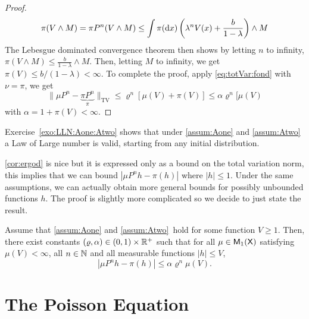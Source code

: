 \documentclass[english,graybox,envcountchap,envcountsame,sectrefs,shortlabels]{svmono}
\theoremstyle{style}
\newenvironment{svmultproof}{\small \begin{proof}}{\end{proof}}
\newcommand{\eqsp}{}
\begin{document}
\begin{svmultproof}
$$
\pi(V\wedge M)=\pi P^n(V\wedge M) \leq \int \pi(\mathrm{d} x) \left(\lambda^n V(x)+\frac{b}{1-\lambda}\right) \wedge M
$$
The Lebesgue dominated convergence theorem then shows by letting $n$ to infinity, $\pi(V\wedge M)\leq \frac{b}{1-\lambda} \wedge M$. Then, letting $M$ to infinity, we get $\pi(V)\leq b/(1-\lambda)<\infty$. To complete the proof, apply \eqref{eq:totVar:fond} with $\nu=\pi$, we get
$$
\|\mu P^n -\underbrace{\pi P^n}_{\pi}\|_{\mathrm{TV}}\leq \varrho^n [\mu(V) +\pi(V)]\leq \alpha \varrho^n [\mu(V)
$$
with $\alpha=1+\pi(V)<\infty$.
\end{svmultproof}


Exercise~\ref{exo:LLN:Aone:Atwo} shows that under \ref{assum:Aone} and \ref{assum:Atwo} a Law of Large number is valid, starting from any initial distribution.

\autoref{cor:ergod} is nice but it is expressed only as a bound on the total variation norm, this implies that we can bound $|\mu P^n h -\pi(h)|$ where $|h|\leq 1$. Under the same assumptions, we can actually obtain more general bounds for possibly unbounded functions $h$. The proof is slightly more complicated so we decide to just state the result.

\begin{shaded}
\begin{theorem} \label{thm:ergo:gener}
 Assume that \ref{assum:Aone} and \ref{assum:Atwo}\ hold for some function $V\geq 1$. Then, there exist constants $(\varrho,\alpha) \in (0,1) \times \mathbb{R}^+$ such that for all $\mu\in\mathsf{M}_{1}(\mathsf{X})$ satisfying $\mu(V)<\infty$, all $n\in\mathbb{N}$ and all measurable functions $|h|\leq V$,
$$
|\mu P^n h -\pi(h)| \leq \alpha \varrho^n \mu(V)\eqsp.
$$
\end{theorem}

\end{shaded}

\section{The Poisson Equation}
\end{document}
